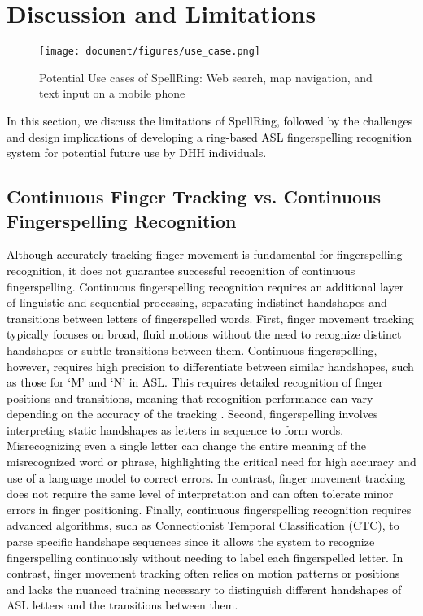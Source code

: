 \section{Discussion and Limitations}

\begin{figure*}[t]
  \texttt{[image: document/figures/use\_case.png]}
  \caption{Potential Use cases of SpellRing: Web search, map navigation, and text input on a mobile phone}
  \label{fig:use_case}
\end{figure*}

\textcolor{black}{In this section, we discuss the limitations of SpellRing, followed by the challenges and design implications of developing a ring-based ASL fingerspelling recognition system for potential future use by DHH individuals.}



\subsection{Continuous Finger Tracking vs. Continuous Fingerspelling Recognition}
\textcolor{black}{
Although accurately tracking finger movement is fundamental for fingerspelling recognition, it does not guarantee successful recognition of continuous fingerspelling. Continuous fingerspelling recognition requires an additional layer of linguistic and sequential processing, separating indistinct handshapes and transitions between letters of fingerspelled words. First, finger movement tracking typically focuses on broad, fluid motions without the need to recognize distinct handshapes or subtle transitions between them. Continuous fingerspelling, however, requires high precision to differentiate between similar handshapes, such as those for `M' and `N' in ASL. This requires detailed recognition of finger positions and transitions, meaning that recognition performance can vary depending on the accuracy of the tracking \cite{taylor2018real}. 
Second, fingerspelling involves interpreting static handshapes as letters in sequence to form words. Misrecognizing even a single letter can change the entire meaning of the misrecognized word or phrase, highlighting the critical need for high accuracy and use of a language model to correct errors. In contrast, finger movement tracking does not require the same level of interpretation and can often tolerate minor errors in finger positioning. Finally, continuous fingerspelling recognition requires advanced algorithms, such as Connectionist Temporal Classification (CTC), to parse specific handshape sequences since it allows the system to recognize fingerspelling continuously without needing to label each fingerspelled letter. In contrast, finger movement tracking often relies on motion patterns or positions and lacks the nuanced training necessary to distinguish different handshapes of ASL letters and the transitions between them.
}


